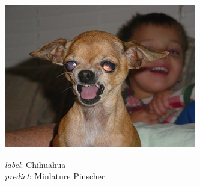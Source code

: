 \documentclass{article}
\begin{document}
\begin{figure}[h]
	\begin{subfigure}{0.32\linewidth}
		\centering
		\includegraphics[width=\linewidth]{pics/s1}
		\caption{}
		\emph{label}: Chihuahua \\ \emph{predict}: Minlature Pinscher
		\label{fig:s1}
	\end{subfigure} 
	

\end{figure}
\end{document}
